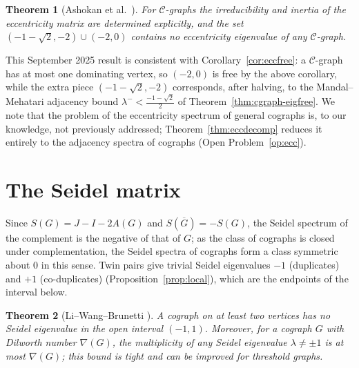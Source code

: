\documentclass[11pt]{article}
\theoremstyle{plain}
\newtheorem{theorem}{Theorem}[section]
\theoremstyle{definition}
\theoremstyle{remark}
\begin{document}
	\begin{theorem}[Ashokan et al.\ \cite{AshokanEccentricity2025}]
		\label{thm:cgraph-eccentricity}
		For $\mathcal{C}$-graphs the irreducibility and inertia of the eccentricity matrix are determined explicitly, and the set $(-1-\sqrt2,-2)\cup(-2,0)$ contains no eccentricity eigenvalue of any $\mathcal{C}$-graph.
	\end{theorem}
	
	This September 2025 result is consistent with Corollary~\ref{cor:eccfree}: a $\mathcal{C}$-graph has at most one dominating vertex, so $(-2,0)$ is free by the above corollary, while the extra piece $(-1-\sqrt2,-2)$ corresponds, after halving, to the Mandal--Mehatari adjacency bound $\lambda^-<\frac{-1-\sqrt2}2$ of Theorem~\ref{thm:cgraph-eigfree}. We note that the problem of the eccentricity spectrum of general cographs is, to our knowledge, not previously addressed; Theorem~\ref{thm:eccdecomp} reduces it entirely to the adjacency spectra of cographs (Open Problem~\ref{op:ecc}).
	
	\section{The Seidel matrix}
	\label{sec:seidel}
	
	Since $S(G)=J-I-2A(G)$ and $S(\overline G)=-S(G)$, the Seidel spectrum of the complement is the negative of that of $G$; as the class of cographs is closed under complementation, the Seidel spectra of cographs form a class symmetric about $0$ in this sense. Twin pairs give trivial Seidel eigenvalues $-1$ (duplicates) and $+1$ (co-duplicates) (Proposition~\ref{prop:local}), which are the endpoints of the interval below.
	
	\begin{theorem}[Li--Wang--Brunetti \cite{LiWangBrunetti2024}]
		\label{thm:LWB}
		A cograph on at least two vertices has no Seidel eigenvalue in the open interval $(-1,1)$. Moreover, for a cograph $G$ with Dilworth number $\nabla(G)$, the multiplicity of any Seidel eigenvalue $\lambda\ne\pm1$ is at most $\nabla(G)$; this bound is tight and can be improved for threshold graphs.
	\end{theorem}
	
\end{document}
